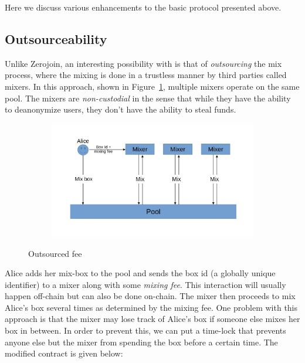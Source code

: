 \documentclass[runningheads]{llncs}
\newcommand{\zerojoin}{Zerojoin\xspace}
\begin{document}
Here we discuss various enhancements to the basic protocol presented above.

\subsection{Outsourceability}

Unlike \zerojoin, an interesting possibility with \algname is that of {\em outsourcing} the mix process, where the mixing is done in a trustless manner by third parties called mixers. In this approach, shown in Figure~\ref{fig:joiner}, multiple mixers operate on the same pool. The mixers are {\em non-custodial} in the sense that while they have the ability to deanonymize users, they don't have the ability to steal funds. 


\begin{figure}[ht]
	\centering
	\begin{subfigure}{0.8\textwidth}
		\centering
		\includegraphics[width=\linewidth]{Joiner.jpg}
	\end{subfigure}%
	\caption{Outsourced fee}
	\label{fig:joiner}
\end{figure}

Alice adds her mix-box to the pool and sends the box id (a globally unique identifier) to a mixer along with some {\em mixing fee}. 
This interaction will usually happen off-chain but can also be done on-chain. The mixer then proceeds to mix Alice's box several times as determined by the mixing fee.
One problem with this approach is that the mixer may lose track of Alice's box if someone else mixes her box in between. In order to prevent this, we can put a time-lock that prevents anyone else but the mixer from spending the box before a certain time. The modified contract is given below:
\end{document}

